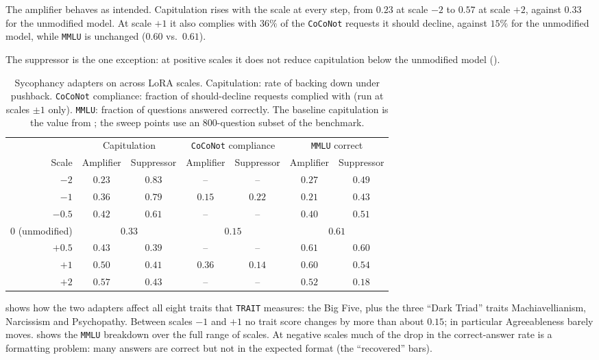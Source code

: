 The amplifier behaves as intended. Capitulation rises with the scale at every step, from $0.23$ at scale $-2$ to $0.57$ at scale $+2$, against $0.33$ for the unmodified model. At scale $+1$ it also complies with $36\%$ of the \texttt{CoCoNot} requests it should decline, against $15\%$ for the unmodified model, while \texttt{MMLU} is unchanged ($0.60$ vs.\ $0.61$).

The suppressor is the one exception: at positive scales it does not reduce capitulation below the unmodified model ().

\begin{table}[htbp]
\centering
\caption{Sycophancy adapters on \LlamaThreePointOneSizeEightBInstruct{} across LoRA scales. Capitulation: rate of backing down under pushback. \texttt{CoCoNot} compliance: fraction of should-decline requests complied with (run at scales $\pm 1$ only). \texttt{MMLU}: fraction of questions answered correctly. The baseline capitulation is the value from ; the sweep points use an $800$-question subset of the benchmark.}
\label{tab:beyond-ocean-syco}
\begin{tabular}{r cc cc cc}
\toprule
 & \multicolumn{2}{c}{Capitulation} & \multicolumn{2}{c}{\texttt{CoCoNot} compliance} & \multicolumn{2}{c}{\texttt{MMLU} correct} \\
\cmidrule(lr){2-3}\cmidrule(lr){4-5}\cmidrule(lr){6-7}
Scale & Amplifier & Suppressor & Amplifier & Suppressor & Amplifier & Suppressor \\
\midrule
$-2$   & $0.23$ & $0.83$ & --     & --     & $0.27$ & $0.49$ \\
$-1$   & $0.36$ & $0.79$ & $0.15$ & $0.22$ & $0.21$ & $0.43$ \\
$-0.5$ & $0.42$ & $0.61$ & --     & --     & $0.40$ & $0.51$ \\
$0$ (unmodified) & \multicolumn{2}{c}{$0.33$} & \multicolumn{2}{c}{$0.15$} & \multicolumn{2}{c}{$0.61$} \\
$+0.5$ & $0.43$ & $0.39$ & --     & --     & $0.61$ & $0.60$ \\
$+1$   & $0.50$ & $0.41$ & $0.36$ & $0.14$ & $0.60$ & $0.54$ \\
$+2$   & $0.57$ & $0.43$ & --     & --     & $0.52$ & $0.18$ \\
\bottomrule
\end{tabular}
\end{table}

 shows how the two adapters affect all eight traits that \texttt{TRAIT} measures: the Big Five, plus the three ``Dark Triad'' traits Machiavellianism, Narcissism and Psychopathy. Between scales $-1$ and $+1$ no trait score changes by more than about $0.15$; in particular Agreeableness barely moves.  shows the \texttt{MMLU} breakdown over the full range of scales. At negative scales much of the drop in the correct-answer rate is a formatting problem: many answers are correct but not in the expected format (the ``recovered'' bars).

